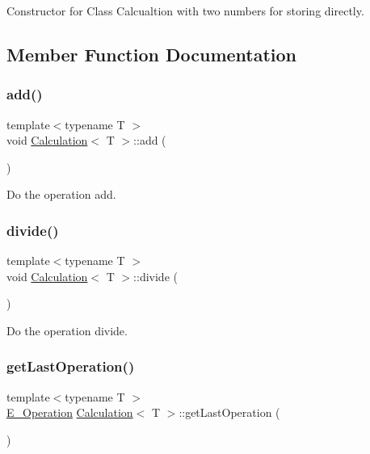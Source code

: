 Constructor for Class Calcualtion with two numbers for storing directly. 



\subsection{Member Function Documentation}
\mbox{\label{class_calculation_ab55212dfa6fb55cee8ab258a8f7472a1}} 
\subsubsection{\texorpdfstring{add()}{add()}}
{\footnotesize\ttfamily template$<$typename T $>$ \\
void \mbox{\hyperlink{class_calculation}{Calculation}}$<$ T $>$\+::add (\begin{DoxyParamCaption}{ }\end{DoxyParamCaption})}



Do the operation add. 

\mbox{\label{class_calculation_aa03d1f9cd24ff9bf03a42847a7d0a67a}} 
\subsubsection{\texorpdfstring{divide()}{divide()}}
{\footnotesize\ttfamily template$<$typename T $>$ \\
void \mbox{\hyperlink{class_calculation}{Calculation}}$<$ T $>$\+::divide (\begin{DoxyParamCaption}{ }\end{DoxyParamCaption})}



Do the operation divide. 

\mbox{\label{class_calculation_a86e902aafc4c73dbd8a4fa637ef92f57}} 
\subsubsection{\texorpdfstring{get\+Last\+Operation()}{getLastOperation()}}
{\footnotesize\ttfamily template$<$typename T $>$ \\
\mbox{\hyperlink{_calculation_8h_a57e7c508a7a8b39e59743eb5a00b2ef7}{E\+\_\+\+Operation}} \mbox{\hyperlink{class_calculation}{Calculation}}$<$ T $>$\+::get\+Last\+Operation (\begin{DoxyParamCaption}{ }\end{DoxyParamCaption})\hspace{0.3cm}{\ttfamily [inline]}}



